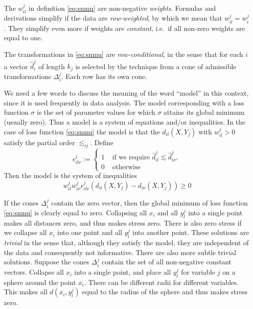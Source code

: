 \documentclass[
  12pt,
]{article}
\begin{document}
The \(w_{il}^j\) in definition \eqref{eq:snmu}
are non-negative \emph{weights}. Formulas and derivations simplify if the data are \emph{row-weighted}, by which we mean that \(w_{il}^j=w_i^j\). They simplify
even more if weights are \emph{constant}, i.e.~if all non-zero weights
are equal to one.

The transformations in \eqref{eq:snmu}
are \emph{row-conditional}, in the sense that for each \(i\) a vector
\(\hat d_i^j\) of length \(k_j\) is selected by the technique
from a cone of admissible transformations \(\Delta_i^j\). Each row has its own cone.

We need a few words to discuss the meaning of the word ``model'' in this
context, since it is used frequently in data analysis. The
model corresponding with a loss function \(\sigma\) is the set of parameter
values for which \(\sigma\) attains its global minimum (usually zero).
Thus a model is a system of equations and/or inequalities.
In the case of loss function \eqref{eq:snmu} the model is
that the \(d_{il}(X,Y_j)\) with \(w_{il}^j>0\) satisfy the partial order \(\lesssim_{ij}\). Define
\begin{equation}
\epsilon^j_{il\nu}:=
\begin{cases}
1&\text{ if we require }\hat d^j_{il}\lesssim\hat d^j_{i\nu},\\
0&\text{ otherwise}
\end{cases}
\end{equation}
Then the model is the system of inequalities
\begin{equation}
w_{il}^jw_{i\nu}^j\epsilon^j_{il\nu}(d_{il}(X,Y_j)-d_{i\nu}(X,Y_j))\geq 0
\label{eq:model}
\end{equation}

If the cones \(\Delta_i^j\) contain the zero vector, then the global minimum of loss function \eqref{eq:snmu} is clearly equal to zero. Collapsing all \(x_i\) and all \(y_l^j\) into a single point makes all distances zero, and thus makes stress zero. There is also zero stress if we collapse all \(x_i\) into one point and all \(y_l^j\) into another point. These solutions are \emph{trivial} in the sense that, although they satisfy the model, they are
independent of the data and consequently not informative. There are also more subtle
trivial solutions.
Suppose the cones \(\Delta_i^j\) contain the set of all non-negative constant vectors. Collapse all \(x_i\) into a single point, and place all \(y_l^j\) for variable \(j\) on a sphere around the point \(x_i\). There can be different radii for different variables. This makes all \(d(x_i,y_l^j)\) equal to the radius of the sphere and thus makes stress zero.
\end{document}
